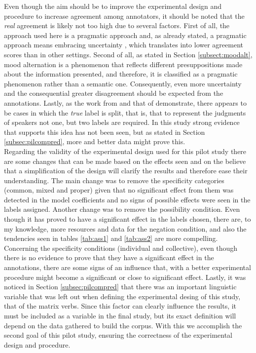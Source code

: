 Even though the aim should be to improve the experimental design and procedure to increase agreement among annotators, it should be noted that the \textit{real} agreement is likely not too high due to several factors. First of all, the approach used here is a pragmatic approach and, as already stated, a pragmatic approach means embracing uncertainty \citep{de2012did}, which translates into lower agreement scores than in other settings. Second of all, as stated in Section \ref{subsect:moodalt}, mood alternation is a phenomenon that reflects different presuppositions made about the information presented, and therefore, it is classified as a pragmatic phenomenon rather than a semantic one. Consequently, even more uncertainty and the consequential greater disagreement should be expected from the annotations. Lastly, as the work from \citet{de2012did} and that of \citet{pavlick2019inherent} demonstrate, there appears to be cases in which the \textit{true} label is split, that is, that to represent the judgments of speakers not one, but two labels are required. In this study strong evidence that supports this idea has not been seen, but as stated in Section \ref{subsec:pilcompred}, more and better data might prove this.\\

Regarding the validity of the experimental design used for this pilot study there are some changes that can be made based on the effects seen and on the believe that a simplification of the design will clarify the results and therefore ease their understanding. The main change was to remove the specificity categories (common, mixed and proper) given that no significant effect from them was detected in the model coefficients and no signs of possible effects were seen in the labels assigned. Another change was to remove the possibility condition. Even though it has proved to have a significant effect in the labels chosen, there are, to my knowledge, more resources and data for the negation condition, and also the tendencies seen in tables \ref{tab:ass1} and \ref{tab:ass2} are more compelling. Concerning the specificity conditions (individual and collective), even though there is no evidence to prove that they have a significant effect in the annotations, there are some signs of an influence that, with a better experimental procedure might become a significant or close to significant effect. Lastly, it was noticed in Section \ref{subsec:pilcompred} that there was an important linguistic variable that was left out when defining the experimental desing of this study, that of the matrix verbs. Since this factor can clearly influence the results, it must be included as a variable in the final study, but its exact definition will depend on the data gathered to build the corpus. With this we accomplish the second goal of this pilot study, ensuring the correctness of the experimental design and procedure.\\

